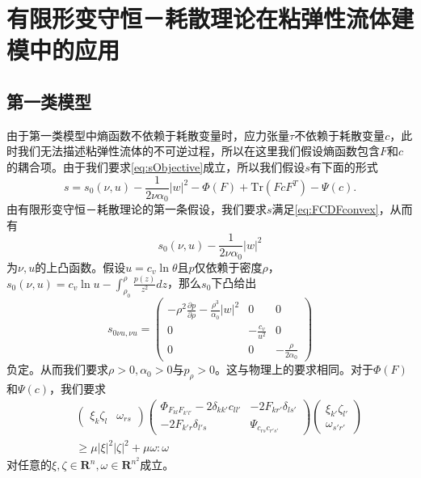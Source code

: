 \section{有限形变守恒－耗散理论在粘弹性流体建模中的应用}
\subsection{第一类模型}
由于第一类模型中熵函数不依赖于耗散变量时，应力张量$\tau$不依赖于耗散变量$c$，此时我们无法描述粘弹性流体的不可逆过程，所以在这里我们假设熵函数包含$F$和$c$的耦合项。由于我们要求\eqref{eq:sObjective}成立，所以我们假设$s$有下面的形式 
 $$s = s_0(\nu,u) - \frac{1}{2 \nu \alpha_0} |w|^2 - \Phi (F) + \mbox{Tr} (FcF^T) - \Psi(c) .$$
由有限形变守恒－耗散理论的第一条假设，我们要求$s$满足\eqref{eq:FCDFconvex}，从而有
\begin{equation*}
	s_0(\nu,u) - \frac{1}{2\nu \alpha_0}|w|^2
\end{equation*}
为$\nu,u$的上凸函数。假设$u = c_v \ln \theta$且$p$仅依赖于密度$\rho$，$s_0(\nu,u) = c_v \ln u - \int_{\rho_0}^\rho \frac{p(z)}{z^2}dz$，那么$s_0$下凸给出
\begin{equation*}
	s_{0\nu u,\nu u} = \left( \begin{array}{ccc}
		- \rho^2 \frac{\partial p}{\partial \rho} - \frac{\rho^3}{\alpha_0}|w|^2 & 0 & 0 \\
		0 & -\frac{c_v}{u^2} & 0 \\
		0 & 0 & -\frac{\rho}{2\alpha_0}
	\end{array}\right)
\end{equation*}
负定。从而我们要求$\rho>0,\alpha_0>0$与$p_\rho>0$。这与物理上的要求相同。对于$\Phi(F)$和$\Psi(c)$，我们要求
\begin{eqnarray*}
	&&\left( \begin{array}{cc}
		\xi_k \zeta_l & \omega_{rs} 
	\end{array}\right)
	\left( \begin{array}{cc}
		\Phi_{F_{kl}F_{k'l'}} - 2\delta_{kk'} c_{ll'}& -2 F_{kr'} \delta_{ls'} \\
		-2 F_{k'r} \delta_{l's} & \Psi_{c_{rs}c_{r's'}}
	\end{array}\right) 
	\left( \begin{array}{c}
		\xi_{k'}  \zeta_{l'} \\ \omega_{s'r'} 
	\end{array}\right) \\
	&&\ge \mu |\xi|^2|\zeta|^2 + \mu \omega:\omega
\end{eqnarray*}
对任意的$\xi,\zeta \in \mathbf{R}^n,\omega \in \mathbf{R}^{n^2}$成立。

